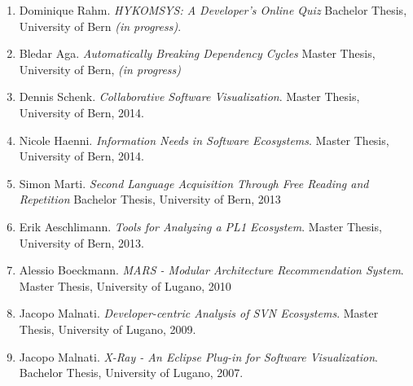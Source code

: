 
\begin{enumerate}

\item Dominique Rahm. \emph{HYKOMSYS: A Developer's Online Quiz} Bachelor Thesis, University of Bern \emph{(in progress)}.

\item Bledar Aga. \emph{Automatically Breaking Dependency Cycles} Master Thesis, University of Bern, \emph{(in progress)}

\item Dennis Schenk. \emph{Collaborative Software Visualization}. Master Thesis, University of Bern, 2014.

\item Nicole Haenni. \emph {Information Needs in Software Ecosystems}. Master Thesis, University of Bern, 2014.

\item Simon Marti. \emph{Second Language Acquisition Through Free Reading and Repetition} Bachelor Thesis, University of Bern, 2013

\item Erik Aeschlimann. \emph {Tools for Analyzing a PL1 Ecosystem}. Master Thesis, University of Bern, 2013.

\item Alessio Boeckmann. \emph{MARS - Modular Architecture Recommendation System}. Master Thesis, University of Lugano, 2010

\item Jacopo Malnati. \emph{Developer-centric Analysis of SVN Ecosystems}. Master Thesis, University of Lugano, 2009.

\item Jacopo Malnati. \emph{X-Ray - An Eclipse Plug-in for Software Visualization}. Bachelor Thesis, University of Lugano, 2007.

\end{enumerate}